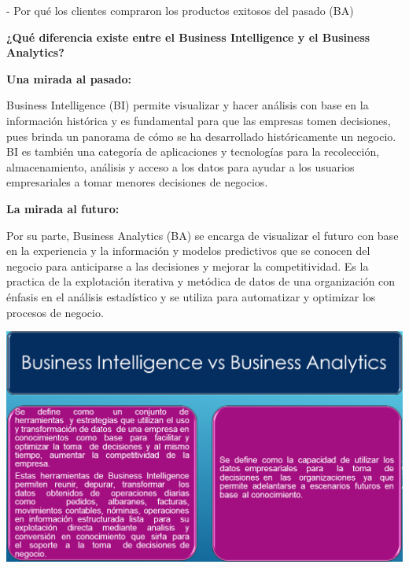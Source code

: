 \begin{flushleft}
\item 
- Por qué los clientes compraron los productos exitosos del pasado (BA)
\item
\item
\begin{center}
\textbf{¿Qué diferencia existe entre el Business Intelligence y el Business Analytics?}\\
\end{center}
\item
\item
\textbf{Una mirada al pasado:}\\
\item
Business Intelligence (BI) permite visualizar y hacer análisis con base en la información histórica y es fundamental para que las empresas tomen decisiones, pues brinda un panorama de cómo se ha desarrollado históricamente un negocio. BI es también una categoría de aplicaciones y tecnologías para la recolección, almacenamiento, análisis y acceso a los datos para ayudar a los usuarios empresariales a tomar menores decisiones de negocios.
\item
\item
\textbf{La mirada al futuro:}\\
\item
Por su parte, Business Analytics (BA) se encarga de visualizar el futuro con base en la experiencia y la información y modelos predictivos que se conocen del negocio para anticiparse a las decisiones y
mejorar la competitividad. Es la practica de la explotación iterativa y metódica de datos de una organización con énfasis en el análisis estadístico y se utiliza para automatizar y optimizar los procesos de negocio.
\item
\item
\begin{center}
\includegraphics[width=17cm]{./Imagenes/image03}

\end{center}
\end{flushleft}
